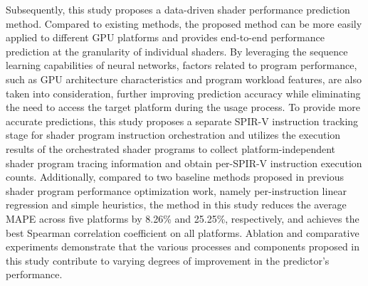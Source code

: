 \begin{abstract*}
{\amend Subsequently, this study proposes a data-driven shader performance prediction method. Compared to existing methods, the proposed method can be more easily applied to different GPU platforms and provides end-to-end performance prediction at the granularity of individual shaders. By leveraging the sequence learning capabilities of neural networks, factors related to program performance, such as GPU architecture characteristics and program workload features, are also taken into consideration, further improving prediction accuracy while eliminating the need to access the target platform during the usage process. To provide more accurate predictions, this study proposes a separate SPIR-V instruction tracking stage for shader program instruction orchestration and utilizes the execution results of the orchestrated shader programs to collect platform-independent shader program tracing information and obtain per-SPIR-V instruction execution counts.} Additionally, compared to two baseline methods proposed in previous shader program performance optimization work, namely per-instruction linear regression and simple heuristics, the method in this study reduces the average MAPE across five platforms by 8.26\% and 25.25\%, respectively, and achieves the best Spearman correlation coefficient on all platforms. {\amend Ablation and comparative experiments demonstrate that the various processes and components proposed in this study contribute to varying degrees of improvement in the predictor's performance.}
\end{abstract*}

